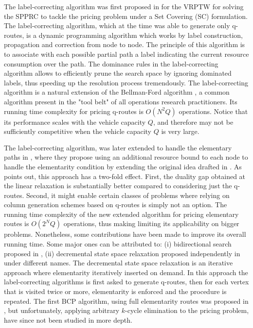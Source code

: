 The label-correcting algorithm was first proposed in \textcite{desrochers1992}
for the VRPTW for solving the SPPRC to tackle the pricing problem
under a Set Covering (SC) formulation.
The label-correcting algorithm, which at the time was able to generate only q-routes,
is a dynamic programming algorithm
which works by label construction, propagation and correction from node to node.
The principle of this algorithm is to associate with each possible partial
path a label indicating the current resource consumption over the path.
The dominance rules in the label-correcting algorithm allows
to efficiently prune the search space by ignoring dominated labels, thus speeding
up the resolution process tremendously.
The label-correcting algorithm
is a natural extension of the Bellman-Ford algorithm \parencite{bellman1958, fordjr1956},
a common algorithm present in the "tool belt" of all operations research practitioners.
Its running time complexity for pricing q-routes is $O(N^2 Q)$ operations.
Notice that its performance scales with the vehicle capacity $Q$, and therefore
may not be sufficiently competitive when the vehicle capacity $Q$ is very large.

The label-correcting algorithm, was later extended to handle
the elementary paths in \textcite{feillet2004},
where they propose using an additional resource bound to each
node to handle the elementarity condition
by extending the original idea drafted in \textcite{beasley1989}.
As \citeauthor{feillet2004} points out, this approach has a two-fold effect.
First, the duality gap obtained at the linear relaxation is substantially better
compared to considering just the q-routes.
Second, it might enable certain classes of problems where relying
on column generation schemes based on q-routes is simply not an option.
The running time complexity of the new extended algorithm for pricing elementary routes
is $O(2^N Q)$ operations,
thus making limiting its applicability on bigger problems.
Nonetheless, some contributions have been made to improve its overall running time.
Some major ones can be attributed to:
(i) bidirectional search proposed in \textcite{righini2006},
(ii) decremental state space relaxation proposed independently in
\textcite{boland2006, righini2008} under different names.
The decremental state space relaxation is an iterative
approach where elementarity iteratively inserted on demand.
In this approach the label-correcting algorithms
is first asked to generate q-routes, then for each vertex that is visited
twice or more, elementarity is enforced and the procedure is repeated.
The first BCP algorithm, using full elementarity routes
was proposed in \cite{chabrier2006}, but unfortunately,
applying arbitrary $k$-cycle elimination to the pricing problem,
have since not been studied in more depth.


